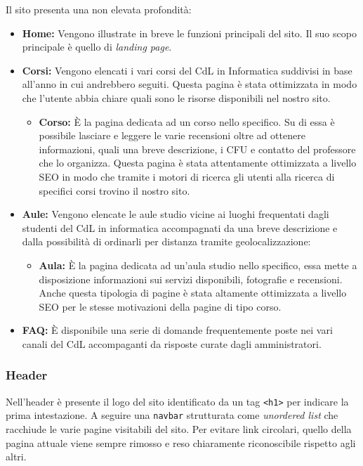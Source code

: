 Il sito presenta una non elevata profondità:
\begin{itemize}
    \item \textbf{Home:} Vengono illustrate in breve le funzioni principali del sito. Il suo scopo principale è quello di \textit{landing page}.
    \item \textbf{Corsi:} Vengono elencati i vari corsi del CdL in Informatica suddivisi in base all'anno in cui andrebbero seguiti. Questa pagina è stata ottimizzata in modo che l'utente abbia chiare quali sono le risorse disponibili nel nostro sito.
        \begin{itemize}
            \item \textbf{Corso:} È la pagina dedicata ad un corso nello specifico. Su di essa è possibile lasciare e leggere le varie recensioni oltre ad ottenere informazioni, quali una breve descrizione, i CFU e contatto del professore che lo organizza. Questa pagina è stata attentamente ottimizzata a livello SEO in modo che tramite i motori di ricerca gli utenti alla ricerca di specifici corsi trovino il nostro sito.
        \end{itemize}
    \item \textbf{Aule:} Vengono elencate le aule studio vicine ai luoghi frequentati dagli studenti del CdL in informatica accompagnati da una breve descrizione e dalla possibilità di ordinarli per distanza tramite geolocalizzazione:
        \begin{itemize}
            \item \textbf{Aula:} È la pagina dedicata ad un'aula studio nello specifico, essa mette a disposizione informazioni sui servizi disponibili, fotografie e recensioni. Anche questa tipologia di pagine è stata altamente ottimizzata a livello SEO per le stesse motivazioni della pagine di tipo corso.
        \end{itemize}
    \item \textbf{FAQ:} È disponibile una serie di domande frequentemente poste nei vari canali del CdL accompaganti da risposte curate dagli amministratori.
\end{itemize}

\subsubsection{Header}
Nell'header è presente il logo del sito identificato da un tag \texttt{<h1>} per indicare la prima intestazione. A seguire una \texttt{navbar} strutturata come \textit{unordered list} che racchiude le varie pagine visitabili del sito. Per evitare link circolari, quello della pagina attuale viene sempre rimosso e reso chiaramente riconoscibile rispetto agli altri.

